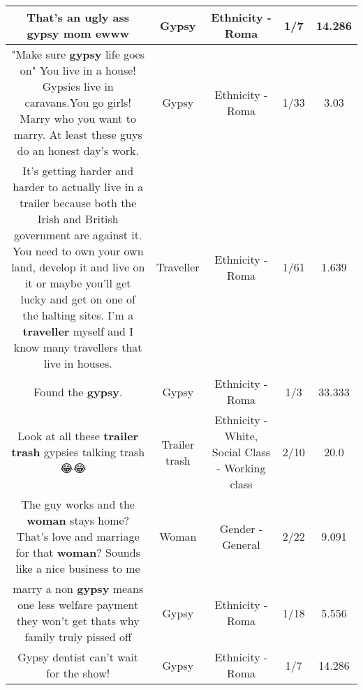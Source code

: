 \documentclass[11pt]{article}
\newlength\mylength
\begin{document}
\begin{center}
\begin{longtable}{|C{.65\mylength}|C{.30\mylength}|C{.12\mylength}|C{.12\mylength}|C{.12\mylength}|}
  \small That's an ugly ass \textbf{gypsy} mom ewww\normalsize   & Gypsy & Ethnicity - Roma & 1/7 & 14.286 \\  \hline
  \small "Make sure \textbf{gypsy} life goes on" You live in a house! Gypsies live in caravans.You go girls! Marry who you want to marry. At least these guys do an honest day's work.\normalsize   & Gypsy & Ethnicity - Roma & 1/33 & 3.03 \\  \hline
  \small {} It's getting harder and harder to actually live in a trailer because both the Irish and British government are against it. You need to own your own land, develop it and live on it or maybe you'll get lucky and get on one of the halting sites. I'm a \textbf{traveller} myself and I know many travellers that live in houses.\normalsize   & Traveller & Ethnicity - Roma & 1/61 & 1.639 \\  \hline
  \small Found the \textbf{gypsy}.\normalsize   & Gypsy & Ethnicity - Roma & 1/3 & 33.333 \\  \hline
  \small Look at all these \textbf{t\textbf{railer trash}} gypsies talking trash 😂😂🤦🏻‍♀️\normalsize   & Trailer trash & Ethnicity - White, Social Class - Working class & 2/10 & 20.0 \\  \hline
  \small The guy works and the \textbf{woman} stays home? That's love and marriage for that \textbf{woman}? Sounds like a nice business to me\normalsize   & Woman & Gender - General & 2/22 & 9.091 \\  \hline
  \small marry a non \textbf{gypsy} means one less welfare payment they won't get thats why family truly pissed off\normalsize   & Gypsy & Ethnicity - Roma & 1/18 & 5.556 \\  \hline
  \small Gypsy dentist can't wait for the show!\normalsize   & Gypsy & Ethnicity - Roma & 1/7 & 14.286 \\  \hline

\end{longtable}
\end{center}
\end{document}
